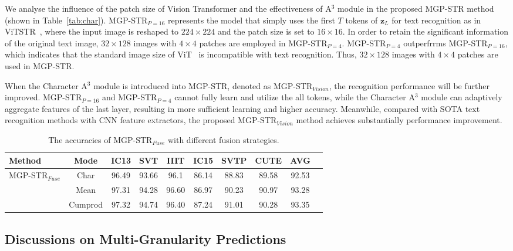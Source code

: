 \documentclass[runningheads]{llncs}
\newcommand{\ra}[1]{\renewcommand{\arraystretch}{#1}}
\begin{document}
We analyse the influence of the patch size of Vision Transformer and the effectiveness of A$^3$ module in the proposed MGP-STR method (shown in Table~\ref{tab:char}). MGP-STR$_{P=16}$ represents the model that simply uses the first $T$ tokens of $\mathbf{z}_L$ for text recognition as in ViTSTR~\cite{ViTSTR}, where the input image is reshaped to $224 \times 224$ and the patch size is set to $16 \times 16 $. In order to retain the significant information of the original text image, $32 \times 128 $ images with $4 \times 4 $ patches are employed in MGP-STR$_{P=4}$. MGP-STR$_{P=4}$ outperfrrms MGP-STR$_{P=16}$, which indicates that the standard image size of ViT~\cite{dosovitskiy2020image,deit} is incompatible with text recognition. Thus, $32 \times 128 $ images with $4 \times 4 $ patches are used in MGP-STR.

When the Character A$^3$ module is introduced into MGP-STR, denoted as MGP-STR$_{Vision}$, the recognition performance will be further improved. MGP-STR$_{P=16}$ and MGP-STR$_{P=4}$ cannot fully learn and utilize the all tokens, while the Character A$^3$ module can adaptively aggregate features of the last layer, resulting in more sufficient learning and higher accuracy. Meanwhile, compared with SOTA text recognition methods with CNN feature extractors, the proposed MGP-STR$_{Vision}$ method achieves substantially performance improvement.


\begin{table*}[t]\centering
\setlength{\tabcolsep}{4pt}
\ra{1}
\caption{The accuracies of MGP-STR$_{Fuse}$ with different fusion strategies.}
\label{tab:fuse}
\begin{tabular}{|l|c|c|c|c|c|c|c|c|c|}
\hline
Method & Mode &IC13&SVT  &IIIT   & IC15 & SVTP &CUTE  &AVG \\
\hline
\multirow{3}{*}{MGP-STR$_{Fuse}$}    &  Char &96.49	&93.66	&96.1	&86.14	&88.83	&89.58	&92.53	 \\
& Mean &97.31	&94.28	&96.60	&86.97	&90.23	&90.97	&93.28	 \\
& Cumprod &97.32	&94.74	&96.40	&87.24	&91.01	&90.28	&93.35	 \\
\hline
\end{tabular}
\end{table*}

\subsection{Discussions on Multi-Granularity Predictions }
\end{document}
